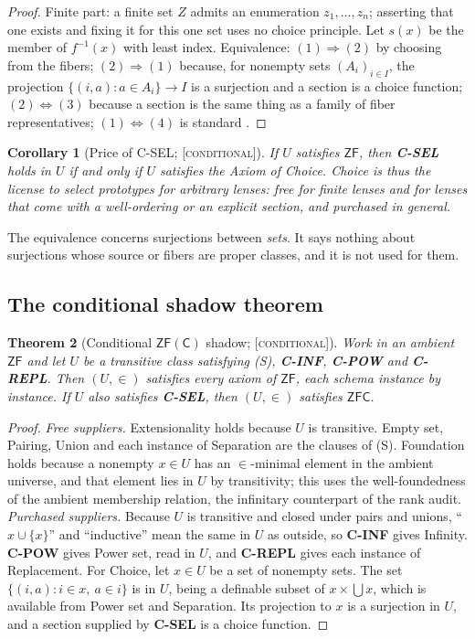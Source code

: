 \documentclass[11pt]{article}
\newcommand{\gradetag}[1]{\textnormal{\textsc{[#1]}}}
\newcommand{\condg}{\gradetag{conditional}}
\newtheorem{theorem}{Theorem}[section]
\newtheorem{corollary}[theorem]{Corollary}
\theoremstyle{definition}
\begin{document}
\begin{proof}
Finite part: a finite set $Z$ admits an enumeration $z_1,\dots,z_n$; asserting that one exists and
fixing it for this one set uses no choice principle. Let $s(x)$ be the member of $f^{-1}(x)$ with
least index. Equivalence: $(1)\Rightarrow(2)$ by choosing from the fibers; $(2)\Rightarrow(1)$
because, for nonempty sets $(A_i)_{i\in I}$, the projection $\{(i,a):a\in A_i\}\to I$ is a
surjection and a section is a choice function; $(2)\Leftrightarrow(3)$ because a section is the
same thing as a family of fiber representatives; $(1)\Leftrightarrow(4)$ is standard
\citep{Jech1973}.
\end{proof}

\begin{corollary}[Price of C-SEL; \condg]\label{cor:choice}
If $U$ satisfies $\mathsf{ZF}$, then \textbf{C-SEL} holds in $U$ if and only if $U$ satisfies the
Axiom of Choice. Choice is thus the license to select prototypes for arbitrary lenses: free for
finite lenses and for lenses that come with a well-ordering or an explicit section, and purchased
in general.
\end{corollary}

The equivalence concerns surjections between \emph{sets}. It says nothing about surjections whose
source or fibers are proper classes, and it is not used for them.

\subsection{The conditional shadow theorem}

\begin{theorem}[Conditional $\mathsf{ZF(C)}$ shadow; \condg]\label{thm:shadow}
Work in an ambient $\mathsf{ZF}$ and let $U$ be a transitive class satisfying \textup{(S)},
\textbf{C-INF}, \textbf{C-POW} and \textbf{C-REPL}. Then $(U,\in)$ satisfies every axiom of
$\mathsf{ZF}$, each schema instance by instance. If $U$ also satisfies \textbf{C-SEL}, then
$(U,\in)$ satisfies $\mathsf{ZFC}$.
\end{theorem}

\begin{proof}
\emph{Free suppliers.} Extensionality holds because $U$ is transitive. Empty set, Pairing, Union
and each instance of Separation are the clauses of (S). Foundation holds because a nonempty
$x\in U$ has an $\in$-minimal element in the ambient universe, and that element lies in $U$ by
transitivity; this uses the well-foundedness of the ambient membership relation, the infinitary
counterpart of the rank audit. \emph{Purchased suppliers.} Because $U$ is transitive and closed
under pairs and unions, ``$x\cup\{x\}$'' and ``inductive'' mean the same in $U$ as outside, so
\textbf{C-INF} gives Infinity. \textbf{C-POW} gives Power set, read in $U$, and \textbf{C-REPL}
gives each instance of Replacement. For Choice, let $x\in U$ be a set of nonempty sets. The set
$\{(i,a): i\in x,\ a\in i\}$ is in $U$, being a definable subset of $x\times\bigcup x$, which is
available from Power set and Separation. Its projection to $x$ is a surjection in $U$, and a
section supplied by \textbf{C-SEL} is a choice function.
\end{proof}
\end{document}

